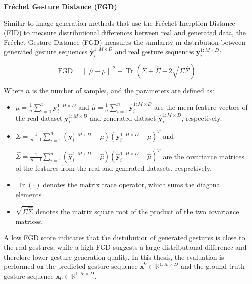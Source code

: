 \textbf{Fréchet Gesture Distance (FGD)}

Similar to image generation methods that use the Fréchet Inception Distance (FID) to measure distributional differences between real and generated data, the Fréchet Gesture Distance (FGD) measures the similarity in distribution between generated gesture sequences $\hat{\mathbf{y}}_i^{1:M \times D}$ and real gesture sequences $\mathbf{y}_i^{1:M \times D}$:

\begin{equation}
	\text{FGD} = \left\| \hat{\mu} - \mu \right\|^2 + \operatorname{Tr}\left( \Sigma + \hat{\Sigma} - 2 \sqrt{\Sigma \hat{\Sigma}} \right)
	\label{eq:fidscore}
\end{equation}

Where $n$ is the number of samples, and the parameters are defined as:

\begin{itemize}
	\item $\mu = \frac{1}{n} \sum_{i=1}^n \mathbf{y}_i^{1:M \times D}$ and $\hat{\mu} = \frac{1}{n} \sum_{i=1}^n \hat{\mathbf{y}}_i^{1:M \times D}$ are the mean feature vectors of the real dataset $\mathbf{y}_i^{1:M \times D}$ and generated dataset $\hat{\mathbf{y}}_i^{1:M \times D}$, respectively.
	
	\item $\Sigma = \frac{1}{n-1} \sum_{i=1}^n \left( \mathbf{y}_i^{1:M \times D} - \mu \right) \left( \mathbf{y}_i^{1:M \times D} - \mu \right)^T$ and
	
	$\hat{\Sigma} = \frac{1}{n-1} \sum_{i=1}^n \left( \hat{\mathbf{y}}_i^{1:M \times D} - \hat{\mu} \right) \left( \hat{\mathbf{y}}_i^{1:M \times D} - \hat{\mu} \right)^T$ are the covariance matrices of the features from the real and generated datasets, respectively.
	
	\item $\operatorname{Tr}(\cdot)$ denotes the matrix trace operator, which sums the diagonal elements.
	
	\item $\sqrt{\Sigma \hat{\Sigma}}$ denotes the matrix square root of the product of the two covariance matrices.
\end{itemize}

A low FGD score indicates that the distribution of generated gestures is close to the real gestures, while a high FGD suggests a large distributional difference and therefore lower gesture generation quality. In this thesis, the evaluation is performed on the predicted gesture sequence $\hat{\mathbf{x}}^{0} \in \mathbb{R}^{1:M \times D}$ and the ground-truth gesture sequence $\mathbf{x}_{0} \in \mathbb{R}^{1:M \times D}$.

